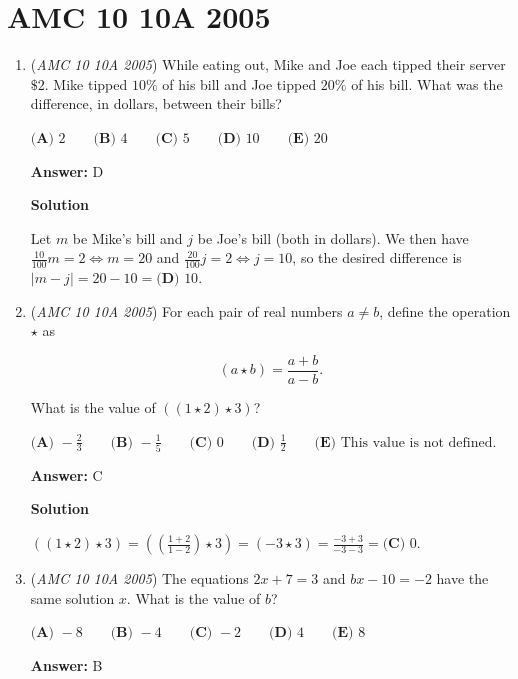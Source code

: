 \section{AMC 10 10A 2005}
        \begin{enumerate}
        	\item (\textit{AMC 10 10A 2005}) While eating out, Mike and Joe each tipped their server $\$2$. Mike tipped $10\%$ of his bill and Joe tipped $20\%$ of his bill. What was the difference, in dollars, between their bills? 


 $\textbf{(A) } 2\qquad \textbf{(B) } 4\qquad \textbf{(C) } 5\qquad \textbf{(D) } 10\qquad \textbf{(E) } 20$

 \textbf{Answer: }D



\textbf{Solution}

Let $m$ be Mike's bill and $j$ be Joe's bill (both in dollars). We then have $\frac{10}{100}m = 2 \iff m = 20$ and $\frac{20}{100}j = 2 \iff j = 10$, so the desired difference is $\left\lvert m-j\right\rvert = 20-10 = \boxed{\textbf{(D) } 10}$.

 


	\item (\textit{AMC 10 10A 2005}) For each pair of real numbers $a \neq b$, define the operation $\star$ as


 
 \[(a \star b) = \frac{a+b}{a-b}.\]


 What is the value of $\left(\left(1 \star 2\right) \star 3\right)$?


 $\textbf{(A) } -\frac{2}{3}\qquad \textbf{(B) } -\frac{1}{5}\qquad \textbf{(C) } 0\qquad \textbf{(D) } \frac{1}{2}\qquad \textbf{(E) } \text{This value is not defined.}$

 \textbf{Answer: }C



\textbf{Solution}

$((1 \star 2) \star 3) = \left(\left(\frac{1+2}{1-2}\right) \star 3\right) = (-3 \star 3) = \frac{-3+3}{-3-3} = \boxed{\textbf{(C) } 0}$.

 


	\item (\textit{AMC 10 10A 2005}) The equations $2x + 7 = 3$ and $bx - 10 = -2$ have the same solution $x$. What is the value of $b$? 


 $\textbf{(A) } -8\qquad \textbf{(B) } -4\qquad \textbf{(C) } -2\qquad \textbf{(D) } 4\qquad \textbf{(E) } 8$

 \textbf{Answer: }B




\end{enumerate}
